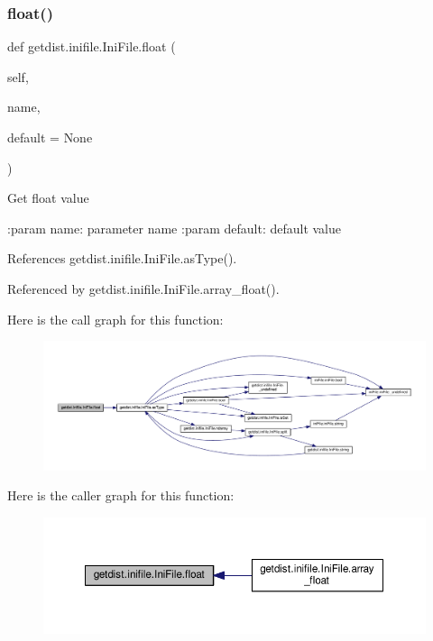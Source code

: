 \subsubsection{\texorpdfstring{float()}{float()}}
{\footnotesize\ttfamily def getdist.\+inifile.\+Ini\+File.\+float (\begin{DoxyParamCaption}\item[{}]{self,  }\item[{}]{name,  }\item[{}]{default = {\ttfamily None} }\end{DoxyParamCaption})}

\begin{DoxyVerb}Get float value

:param name: parameter name
:param default: default value
\end{DoxyVerb}
 

References getdist.\+inifile.\+Ini\+File.\+as\+Type().



Referenced by getdist.\+inifile.\+Ini\+File.\+array\+\_\+float().

Here is the call graph for this function\+:
\nopagebreak
\begin{figure}[H]
\begin{center}
\leavevmode
\includegraphics[width=350pt]{classgetdist_1_1inifile_1_1IniFile_ae6d8dedd31b32977a6a1340e6bbcf04f_cgraph}
\end{center}
\end{figure}
Here is the caller graph for this function\+:
\nopagebreak
\begin{figure}[H]
\begin{center}
\leavevmode
\includegraphics[width=350pt]{classgetdist_1_1inifile_1_1IniFile_ae6d8dedd31b32977a6a1340e6bbcf04f_icgraph}
\end{center}
\end{figure}
\mbox{\label{classgetdist_1_1inifile_1_1IniFile_a0fe37e4aafe74c0bea80d1e7912e3d63}} 
